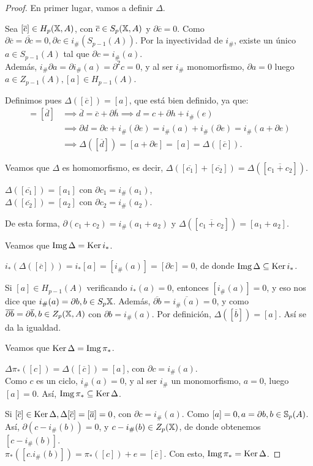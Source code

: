 \begin{proof}
  En primer lugar, vamos a definir $\Delta$.

  Sea $[\overline{c}] \in H_p(\X, A)$, con $\overline{c} \in S_p(\X, A)$ y $\partial \overline{c} = 0$. Como $\partial \overline{c} = \overline{\partial c} = 0,
  \partial c \in i_\#(S_{p-1}(A))$. Por la inyectividad de $i_\#$, existe un único $a \in S_{p-1}(A)$ tal que $\partial c = i_\#(a)$. \\
  Además, $i_\# \partial a = \partial i_\#(a) = \partial^2 c = 0$, y al ser $i_\#$ monomorfismo, $\partial a = 0$ luego $a \in Z_{p-1}(A), [a] \in H_{p-1}(A)$.

  Definimos pues $\Delta([\overline{c}]) = [a]$, que está bien definido, ya que:
  \begin{align*}
    [\overline{c}] = [\overline{d}] &\implies \overline{d} = \overline{c} + \partial \overline{h} \implies d = c + \partial h + i_\#(e) \\
    &\implies \partial d = \partial c + i_\#(\partial e) = i_\#(a) + i_\#(\partial e) = i_\#(a + \partial e) \\
    &\implies \Delta([\overline{d}]) = [a + \partial e] = [a] = \Delta([\overline{c}]).
  \end{align*}

  Veamos que $\Delta$ es homomorfismo, es decir, $\Delta([\overline{c_1}] + [\overline{c_2}]) = \Delta([\overline{c_1 + c_2}])$.

  $\Delta([\overline{c_1}]) = [a_1]$ con $\partial c_1 = i_\#(a_1)$, \\
  $\Delta([\overline{c_2}]) = [a_2]$ con $\partial c_2 = i_\#(a_2)$.

  De esta forma, $\partial(c_1 + c_2) = i_\#(a_1 + a_2)$ y $\Delta([\overline{c_1 + c_2}]) = [a_1 + a_2]$.

  Veamos que $\Img \Delta = \Ker i_*$.

  $i_*(\Delta([\overline{c}])) = i_*[a] = [i_\#(a)] = [\partial c] = 0$, de donde $\Img \Delta \subseteq \Ker i_*$.

  Si $[a] \in H_{p-1}(A)$ verificando $i_*(a) = 0$, entonces $[i_\#(a)] = 0$, y eso nos dice que $i_\#(a) = \partial b, b \in S_p{\X}$.
  Además, $\overline{\partial b} = \overline{i_\#(a)} = 0$, y como $\overline{\partial b} = \partial \overline{b}, b \in Z_p(\X, A)$ con
  $\partial b = i_\#(a)$. Por definición, $\Delta([\overline{b}]) = [a]$. Así se da la igualdad.

  Veamos que $\Ker \Delta = \Img \pi_*$.

  $\Delta\pi_*([c]) = \Delta([\overline{c}]) = [a]$, con $\partial c = i_\#(a)$. \\
  Como $c$ es un ciclo, $i_\#(a) = 0$, y al ser $i_\#$ un monomorfismo, $a = 0$, luego $[a] = 0$. Así, $\Img \pi_* \subseteq \Ker \Delta$.

  Si $[\overline{c}] \in \Ker \Delta, \Delta[\overline{c}] = [\overline{a}] = 0$, con $\partial c = i_\#(a)$. Como $[a] = 0, a = \partial b, b \in \S_p(A)$.
  Así, $\partial(c - i_\#(b)) = 0$, y $c - i_\#(b) \in Z_p(\X)$, de donde obtenemos $[c - i_\#(b)]$. \\
  $\pi_*([c . i_\#(b)]) = \pi_*([c]) + e = [\overline{c}]$. Con esto, $\Img \pi_* = \Ker \Delta$.
\end{proof}

